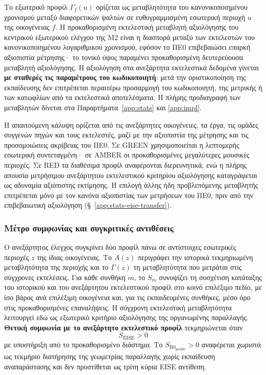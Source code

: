 \documentclass[11pt,a4paper]{article}
\begin{document}
Το εξωτερικό προφίλ $\Gamma_f(u)$ ορίζεται ως μεταβλητότητα του κανονικοποιημένου χρονισμού μεταξύ διαφορετικών ψαλτών σε ευθυγραμμισμένη εσωτερική περιοχή $u$ της οικογένειας $f$. Η προκαθορισμένη εκτελεστική μεταβλητή αξιολόγησης του κεντρικού εξωτερικού ελέγχου της M2 είναι η διασπορά μεταξύ των εκτελεστών του κανονικοποιημένου λογαριθμικού χρονισμού, εφόσον το ΠΕ0 επιβεβαιώσει επαρκή αξιοπιστία μέτρησης· το τονικό ύψος παραμένει προκαθορισμένη δευτερεύουσα μεταβλητή αξιολόγησης. Η αξιολόγηση στα ανεξάρτητα εκτελεστικά δεδομένα γίνεται \textbf{με σταθερές τις παραμέτρους του κωδικοποιητή}: μετά την οριστικοποίηση της εκπαίδευσης δεν επιτρέπεται περαιτέρω προσαρμογή του κωδικοποιητή, της μετρικής ή των κατωφλίων από τα εκτελεστικά αποτελέσματα. Η πλήρης προδιαγραφή των μεταβλητών δίνεται στα Παραρτήματα~\ref{app:stats} και \ref{app:impl}.

Η απαιτούμενη κάλυψη ορίζεται από τις ανεξάρτητες οικογένειες, τα έργα, τις ομάδες συγγενών πηγών και τους εκτελεστές, μαζί με την αξιοπιστία της μέτρησης και τις προσομοιώσεις ακρίβειας του ΠΕ0. Σε GREEN χρησιμοποιείται η λεπτομερής εσωτερική συντεταγμένη· σε AMBER οι προκαθορισμένες μεγαλύτερες μουσικές περιοχές. Σε RED τα διαθέσιμα προφίλ αναφέρονται διερευνητικά, ενώ η πλήρης απουσία μετρήσιμου ανεξάρτητου εκτελεστικού κριτηρίου αξιολόγησης καταγράφεται ως αδυναμία αξιόπιστης εκτίμησης. Η επιλογή άλλης ήδη προβλεπόμενης μεταβλητής επιτρέπεται μόνο με τον κανόνα αξιοπιστίας των μετρήσεων του ΠΕ0, πριν από την επιβεβαιωτική αξιολόγηση (§~\ref{app:stats-eise-transfer}).

\subsubsection{Μέτρο συμφωνίας και συγκριτικές αντιθέσεις}

Ο ανεξάρτητος έλεγχος συγκρίνει δύο προφίλ πάνω σε αντίστοιχες εσωτερικές περιοχές $z$ της ίδιας οικογένειας. Το $A(z)$ περιγράφει την ιστορικά τεκμηριωμένη μεταβλητότητα της περιοχής και το $\Gamma(z)$ τη μεταβλητότητα που μετράται στις σύγχρονες εκτελέσεις. Για κάθε συνθήκη $m$, το $S_m$ συνοψίζει τη συσχέτιση κατάταξης του ιστορικού και του ανεξάρτητου εκτελεστικού προφίλ στο κοινό επιλέξιμο πεδίο, με ίσο βάρος ανά επιλέξιμη οικογένεια και, για τις εκπαιδευμένες συνθήκες, μέσο όρο στις προκαθορισμένες επαναλήψεις. Η σύγχρονη εκτελεστική μεταβλητότητα λειτουργεί εδώ ως εξωτερικό κριτήριο αξιολόγησης της οργανωμένης παραλλαγής. \textbf{Θετική συμφωνία με το ανεξάρτητο εκτελεστικό προφίλ} τεκμηριώνεται όταν
\[
S_{\mathrm{EISE}}>0
\]
με υποστήριξη από το προκαθορισμένο διάστημα. Το $S_{\mathrm{B0}_{\mathrm{profile}}}>0$ αναφέρεται χωριστά ως τεκμήριο διατήρησης της γεωμετρίας παραλλαγής χωρίς εκπαίδευση αναπαράστασης και δεν προστίθεται ως τρίτη κύρια EISE αντίθεση.
\end{document}
